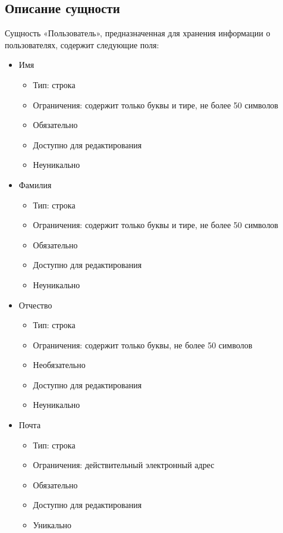 \documentclass[data-specification.tex]{subfiles}
\begin{document}
\subsection{Описание сущности}
\par
Сущность «Пользователь», предназначенная для хранения информации о пользователях, содержит следующие поля:
\begin{itemize}
    \item Имя
    \begin{itemize}
        \item Тип: строка
        \item Ограничения: содержит только буквы и тире, не более 50 символов
        \item Обязательно
        \item Доступно для редактирования
        \item Неуникально
    \end{itemize}
    \item Фамилия
    \begin{itemize}
        \item Тип: строка
        \item Ограничения: содержит только буквы и тире, не более 50 символов
        \item Обязательно
        \item Доступно для редактирования
        \item Неуникально
    \end{itemize}
    \item Отчество
    \begin{itemize}
        \item Тип: строка
        \item Ограничения: содержит только буквы, не более 50 символов
        \item Необязательно
        \item Доступно для редактирования
        \item Неуникально
    \end{itemize}
    \item Почта
    \begin{itemize}
        \item Тип: строка
        \item Ограничения: действительный электронный адрес
        \item Обязательно
        \item Доступно для редактирования
        \item Уникально

\end{itemize}
\end{itemize}
\end{document}
